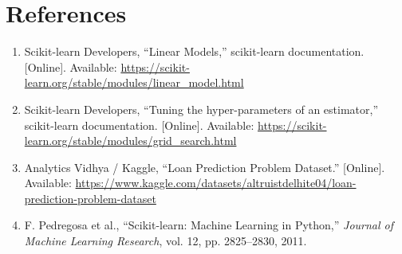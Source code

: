 \documentclass[12pt,a4paper]{article}
\DeclareRobustCommand{\_}{\textunderscore\allowbreak}
\begin{document}
\section{References}
\begin{enumerate}
\item Scikit-learn Developers, ``Linear Models,'' scikit-learn
documentation. [Online]. Available:
\url{https://scikit-learn.org/stable/modules/linear_model.html}
\item Scikit-learn Developers, ``Tuning the hyper-parameters of an
estimator,'' scikit-learn documentation. [Online]. Available:
\url{https://scikit-learn.org/stable/modules/grid_search.html}
\item Analytics Vidhya / Kaggle, ``Loan Prediction Problem Dataset.''
[Online]. Available:
\url{https://www.kaggle.com/datasets/altruistdelhite04/loan-prediction-problem-dataset}
\item F. Pedregosa et al., ``Scikit-learn: Machine Learning in Python,''
\emph{Journal of Machine Learning Research}, vol. 12, pp. 2825--2830, 2011.
\end{enumerate}
\end{document}
